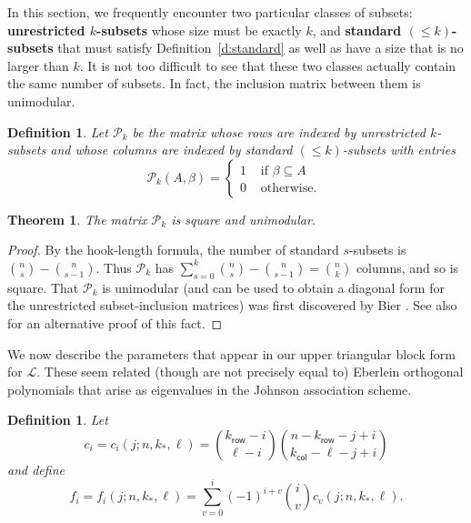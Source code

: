 \documentclass[11pt]{article}
\newtheorem{definition}[theo]{Definition}
\newtheorem{theorem}[theo]{Theorem}
\theoremstyle{definition}
\numberwithin{equation}{section}
\numberwithin{equation}{section}
\renewcommand{\L}{\mathcal{L}}
\renewcommand{\P}{\mathcal{P}}
\newcommand{\kr}{{k}_{\mathsf{row}}}
\newcommand{\kc}{{k}_{\mathsf{col}}}
\newcommand{\kk}{{k}_{\mathsf{*}}}
\begin{document}
In this section, we frequently encounter two particular classes of subsets:  {\bf unrestricted $k$-subsets} whose size must be exactly $k$, and {\bf standard $(\leq k)$-subsets} that must satisfy Definition~\ref{d:standard} as well as have a size that is no larger than $k$.  It is not too difficult to see that these two classes actually contain the same number of subsets.  In fact, the inclusion matrix between them is unimodular.

\begin{definition}\label{d:p}
Let $\P_k$ be the matrix whose rows are indexed by unrestricted $k$-subsets and whose columns are indexed by standard $(\leq k)$-subsets with entries
\[ \P_k(A, \beta) = \begin{cases} 1 & \text{ if $\beta \subseteq A$ } \\ 0 & \text{ otherwise. } \end{cases} \]
\end{definition}

\begin{theorem}
The matrix $\P_k$ is square and unimodular.
\end{theorem}
\begin{proof}
By the hook-length formula, the number of standard $s$-subsets is $\binom{n}{s} - \binom{n}{s-1}$.  Thus $\P_k$ has $\sum_{s=0}^{k} \binom{n}{s} - \binom{n}{s-1} = \binom{n}{k}$ columns, and so is square.  That $\P_k$ is unimodular (and can be used to obtain a diagonal form for the unrestricted subset-inclusion matrices) was first discovered by Bier \cite{bier}.  See also \cite[Theorem 8]{resilience} for an alternative proof of this fact.
\end{proof}

We now describe the parameters that appear in our upper triangular block form for $\L$.  These seem related (though are not precisely equal to) Eberlein orthogonal polynomials that arise as eigenvalues in the Johnson association scheme.

\begin{definition}\label{d:cf}
    Let 
    \[ c_i = c_i(j; n, \kk, \ell) = \binom{\kr-i}{\ell-i}\binom{n-\kr-j+i}{\kc-\ell-j+i} \]
    and define
    \[ f_i = f_i(j; n, \kk, \ell) = \sum_{v=0}^i (-1)^{i+v} \binom{i}{v} c_v(j; n, \kk, \ell). \]
\end{definition}
\end{document}
